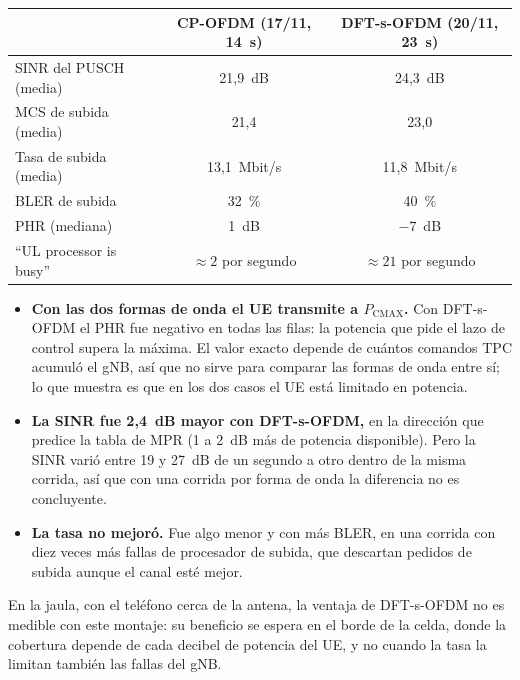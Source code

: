 \begin{center}
\begin{tabular}{lcc}
\toprule
 & CP-OFDM (17/11, 14~s) & DFT-s-OFDM (20/11, 23~s) \\
\midrule
SINR del PUSCH (media) & 21,9~dB & 24,3~dB \\
MCS de subida (media) & 21,4 & 23,0 \\
Tasa de subida (media) & 13,1~Mbit/s & 11,8~Mbit/s \\
BLER de subida & 32~\% & 40~\% \\
PHR (mediana) & 1~dB & $-7$~dB \\
``UL processor is busy'' & $\approx 2$ por segundo & $\approx 21$ por segundo \\
\bottomrule
\end{tabular}
\end{center}

\begin{itemize}
  \item \textbf{Con las dos formas de onda el UE transmite a $P_\text{CMAX}$.} Con DFT-s-OFDM el PHR fue negativo en todas las filas: la potencia que pide el lazo de control supera la máxima. El valor exacto depende de cuántos comandos TPC acumuló el gNB, así que no sirve para comparar las formas de onda entre sí; lo que muestra es que en los dos casos el UE está limitado en potencia.
  \item \textbf{La SINR fue 2,4~dB mayor con DFT-s-OFDM,} en la dirección que predice la tabla de MPR (1 a 2~dB más de potencia disponible). Pero la SINR varió entre 19 y 27~dB de un segundo a otro dentro de la misma corrida, así que con una corrida por forma de onda la diferencia no es concluyente.
  \item \textbf{La tasa no mejoró.} Fue algo menor y con más BLER, en una corrida con diez veces más fallas de procesador de subida, que descartan pedidos de subida aunque el canal esté mejor.
\end{itemize}
En la jaula, con el teléfono cerca de la antena, la ventaja de DFT-s-OFDM no es medible con este montaje: su beneficio se espera en el borde de la celda, donde la cobertura depende de cada decibel de potencia del UE, y no cuando la tasa la limitan también las fallas del gNB.


